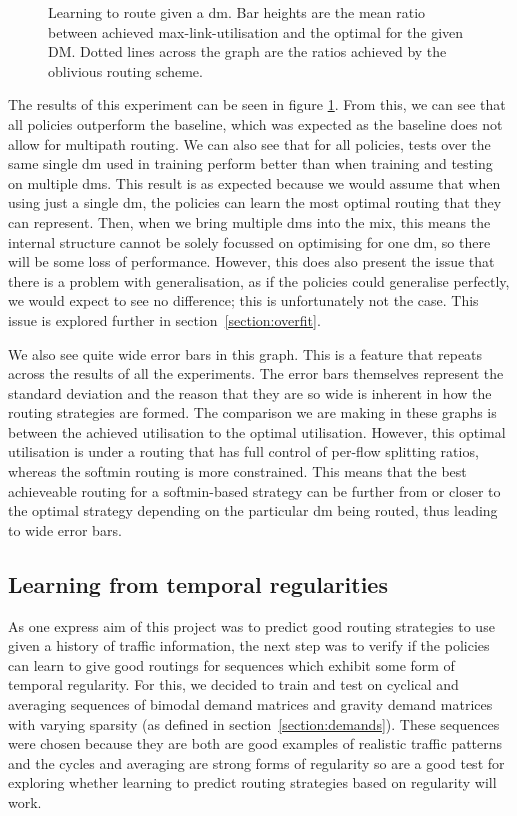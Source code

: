 \begin{figure}
    \centering
    \resizebox{\textwidth}{!}{}
    \caption{Learning to route given a \ac{dm}. Bar heights are the mean ratio between achieved max-link-utilisation and the optimal for the given DM. Dotted lines across the graph are the ratios achieved by the oblivious routing scheme.}
    \label{fig:exp_static}
\end{figure}

The results of this experiment can be seen in figure \ref{fig:exp_static}. From this, we can see that all policies outperform the baseline, which was expected as the baseline does not allow for multipath routing. We can also see that for all policies, tests over the same single \ac{dm} used in training perform better than when training and testing on multiple \acp{dm}. This result is as expected because we would assume that when using just a single \ac{dm}, the policies can learn the most optimal routing that they can represent. Then, when we bring multiple \acp{dm} into the mix, this means the internal structure cannot be solely focussed on optimising for one \ac{dm}, so there will be some loss of performance. However, this does also present the issue that there is a problem with generalisation, as if the policies could generalise perfectly, we would expect to see no difference; this is unfortunately not the case. This issue is explored further in section~\ref{section:overfit}.

We also see quite wide error bars in this graph. This is a feature that repeats across the results of all the experiments. The error bars themselves represent the standard deviation and the reason that they are so wide is inherent in how the routing strategies are formed. The comparison we are making in these graphs is between the achieved utilisation to the optimal utilisation. However, this optimal utilisation is under a routing that has full control of per-flow splitting ratios, whereas the softmin routing is more constrained. This means that the best achieveable routing for a softmin-based strategy can be further from or closer to the optimal strategy depending on the particular \ac{dm} being routed, thus leading to wide error bars.


\subsection{Learning from temporal regularities}
As one express aim of this project was to predict good routing strategies to use given a history of traffic information, the next step was to verify if the policies can learn to give good routings for sequences which exhibit some form of temporal regularity. For this, we decided to train and test on cyclical and averaging sequences of bimodal demand matrices and gravity demand matrices with varying sparsity (as defined in section~\ref{section:demands}). These sequences were chosen because they are both are good examples of realistic traffic patterns and the cycles and averaging are strong forms of regularity so are a good test for exploring whether learning to predict routing strategies based on regularity will work.

